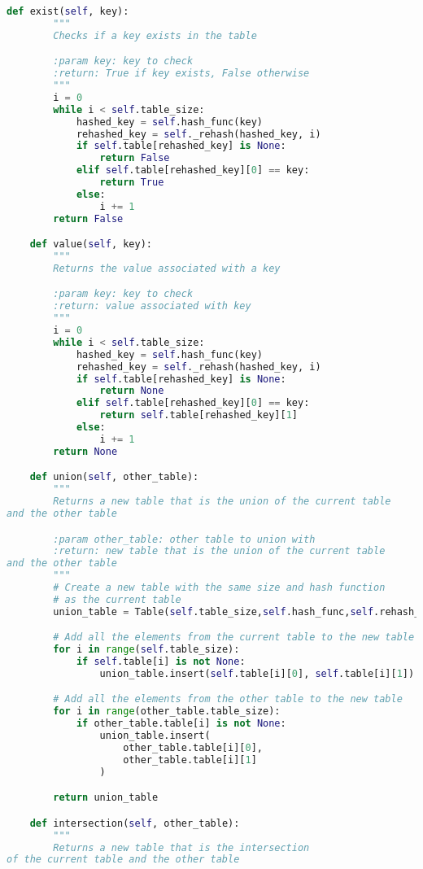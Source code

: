 \documentclass{article}
\begin{document}
\begin{lstlisting}[language=Python,label={lst:codesrc}]
    def exist(self, key):
        """
        Checks if a key exists in the table

        :param key: key to check
        :return: True if key exists, False otherwise
        """
        i = 0
        while i < self.table_size:
            hashed_key = self.hash_func(key)
            rehashed_key = self._rehash(hashed_key, i)
            if self.table[rehashed_key] is None:
                return False
            elif self.table[rehashed_key][0] == key:
                return True
            else:
                i += 1
        return False

    def value(self, key):
        """
        Returns the value associated with a key

        :param key: key to check
        :return: value associated with key
        """
        i = 0
        while i < self.table_size:
            hashed_key = self.hash_func(key)
            rehashed_key = self._rehash(hashed_key, i)
            if self.table[rehashed_key] is None:
                return None
            elif self.table[rehashed_key][0] == key:
                return self.table[rehashed_key][1]
            else:
                i += 1
        return None

    def union(self, other_table):
        """
        Returns a new table that is the union of the current table
and the other table

        :param other_table: other table to union with
        :return: new table that is the union of the current table
and the other table
        """
        # Create a new table with the same size and hash function
        # as the current table
        union_table = Table(self.table_size,self.hash_func,self.rehash_type)

        # Add all the elements from the current table to the new table
        for i in range(self.table_size):
            if self.table[i] is not None:
                union_table.insert(self.table[i][0], self.table[i][1])

        # Add all the elements from the other table to the new table
        for i in range(other_table.table_size):
            if other_table.table[i] is not None:
                union_table.insert(
                    other_table.table[i][0],
                    other_table.table[i][1]
                )

        return union_table

    def intersection(self, other_table):
        """
        Returns a new table that is the intersection
of the current table and the other table


\end{lstlisting}
\end{document}
